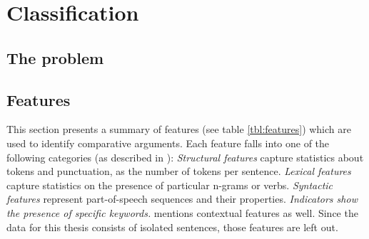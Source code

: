 \chapter{Classification}
\section{The problem}
\label{sec:problem}
\section{Features}
\label{sec:features}
This section presents a summary of features (see table \ref{tbl:features}) which are used to identify comparative arguments.  Each feature falls into one of the following categories (as described in \cite{Aker2017What-works-and-}): \emph{Structural features} capture statistics about tokens and punctuation, as the number of tokens per sentence. \emph{Lexical features} capture statistics on the presence of particular n-grams or verbs. \emph{Syntactic features} represent part-of-speech sequences and their properties. \emph{Indicators show the presence of specific keywords.}
\cite{Aker2017What-works-and-} mentions contextual features as well. Since the data for this thesis consists of isolated sentences, those features are left out.

